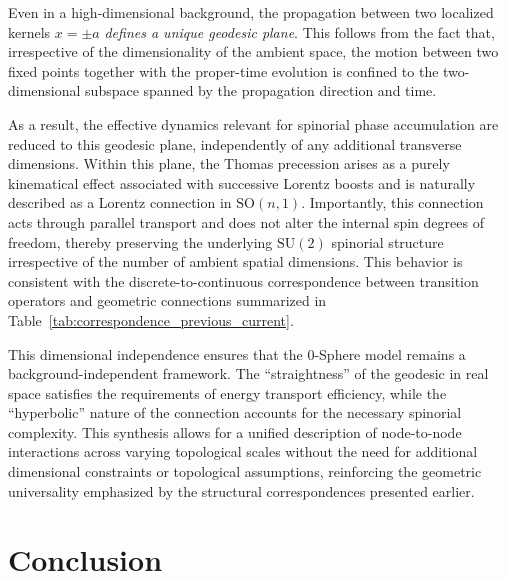 \documentclass[%
 reprint,
 amsmath,amssymb,
 aps,
 prb,
]{revtex4-2}
\numberwithin{equation}{section}
\begin{document}
Even in a high-dimensional background, the propagation between two localized kernels $x = \pm a$ \textit{defines a unique geodesic plane}. 
This follows from the fact that, irrespective of the dimensionality of the ambient space, the motion between two fixed points together with the proper-time evolution is confined to the two-dimensional subspace spanned by the propagation direction and time. 


As a result, the effective dynamics relevant for spinorial phase accumulation are reduced to this geodesic plane, independently of any additional transverse dimensions. Within this plane, the Thomas precession arises as a purely kinematical effect associated with successive Lorentz boosts and is naturally described as a Lorentz connection in $\mathrm{SO}(n,1)$. 
Importantly, this connection acts through parallel transport and does not alter the internal spin degrees of freedom, thereby preserving the underlying $\mathrm{SU}(2)$ spinorial structure irrespective of the number of ambient spatial dimensions. 
This behavior is consistent with the discrete-to-continuous correspondence between transition operators and geometric connections summarized in Table~\ref{tab:correspondence_previous_current}.


This dimensional independence ensures that the 0-Sphere model remains a background-independent framework. The ``straightness'' of the geodesic in real space satisfies the requirements of energy transport efficiency, while the ``hyperbolic'' nature of the connection accounts for the necessary spinorial complexity. This synthesis allows for a unified description of node-to-node interactions across varying topological scales without the need for additional dimensional constraints or topological assumptions, reinforcing the geometric universality emphasized by the structural correspondences presented earlier.

\vspace{20mm}

\section{Conclusion}
\end{document}
